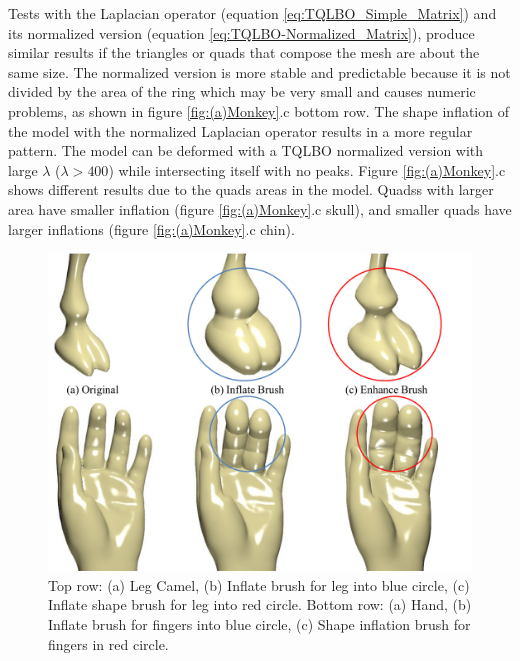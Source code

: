 \documentclass[10pt, conference]{IEEEtran}
\begin{document}
Tests with the Laplacian operator (equation \ref{eq:TQLBO_Simple_Matrix})
and its normalized version (equation \ref{eq:TQLBO-Normalized_Matrix}),
produce similar results if the triangles or quads that compose the
mesh are about the same size. The normalized version is more stable
and predictable because it is not divided by the area of the ring
which may be very small and causes numeric problems, as shown in figure
\ref{fig:(a)Monkey}.c bottom row. The shape inflation of the model
with the normalized Laplacian operator results in a more regular pattern.
The model can be deformed with a TQLBO normalized version with large
$\lambda$ ($\lambda>400$) while intersecting itself with no peaks.
Figure \ref{fig:(a)Monkey}.c shows different results due to the quads
areas in the model. Quadss with larger area have smaller inflation
(figure \ref{fig:(a)Monkey}.c skull), and smaller quads have larger
inflations (figure \ref{fig:(a)Monkey}.c chin).

\begin{figure}
\includegraphics[width=1\columnwidth]{figs/sculpt_brush}

\caption{\label{fig:Sculpt_Brush}Top row: (a) Leg Camel, (b) Inflate brush
for leg into blue circle, (c) Inflate shape brush for leg into red
circle. Bottom row: (a) Hand, (b) Inflate brush for fingers into blue
circle, (c) Shape inflation brush for fingers in red circle.}
\end{figure}
\end{document}

